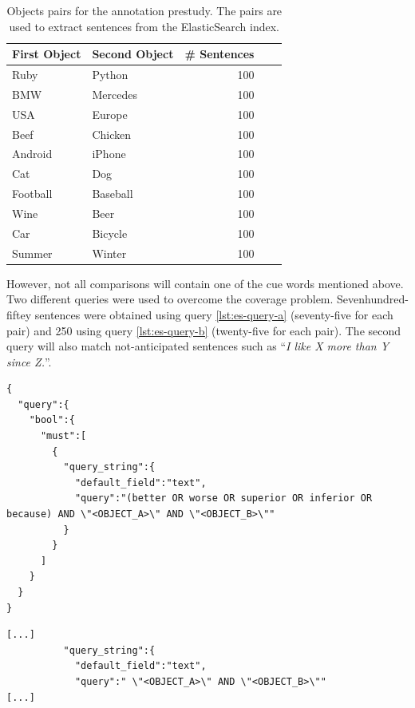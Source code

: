 \begin{table}[h]
\centering
\caption{Objects pairs for the annotation prestudy. The pairs are used to extract sentences from the ElasticSearch index.}
\label{tbl:prestudy-objects}
\begin{tabular}{@{}llrrr@{}}
\toprule
First Object & Second Object      & \# Sentences                             \\ \midrule
Ruby    & Python    & 100      \\
BMW    & Mercedes    & 100  \\
USA & Europe & 100 \\
Beef & Chicken & 100   \\
Android & iPhone    &   100  \\
Cat & Dog      &     100  \\ 
Football & Baseball   &  100 \\ 
Wine & Beer  & 100  \\
Car & Bicycle & 100 \\
Summer & Winter &  100\\
\bottomrule  
                               
\end{tabular}
\end{table}

However, not all comparisons will contain one of the cue words mentioned above. Two different queries were used to overcome the coverage problem. Sevenhundred-fiftey sentences were obtained using query \ref{lst:es-query-a} (seventy-five for each pair) and 250 using query \ref{lst:es-query-b} (twenty-five for each pair). The second query will also match not-anticipated sentences such as \enquote{\emph{I like X more than Y since Z.}}.



\begin{lstlisting}[label=lst:es-query-a,breaklines=true,postbreak=\mbox{\textcolor{red}{$\hookrightarrow$}\space},caption=First query used to extract the sentences for the prestudy from the ElasticSearch index. OBJECT\_A and OBJECT\_B are placeholders for the first and second object from the pairs.]
{
  "query":{
    "bool":{
      "must":[
        {
          "query_string":{
            "default_field":"text",
            "query":"(better OR worse OR superior OR inferior OR because) AND \"<OBJECT_A>\" AND \"<OBJECT_B>\""
          }
        }
      ]
    }
  }
}
\end{lstlisting}

\begin{lstlisting}[label=lst:es-query-b,breaklines=true,postbreak=\mbox{\textcolor{red}{$\hookrightarrow$}\space},caption=Second query for the prestudy (shortened). This query does not search for the cue words.]
[...]
          "query_string":{
            "default_field":"text",
            "query":" \"<OBJECT_A>\" AND \"<OBJECT_B>\""
[...]
\end{lstlisting}

